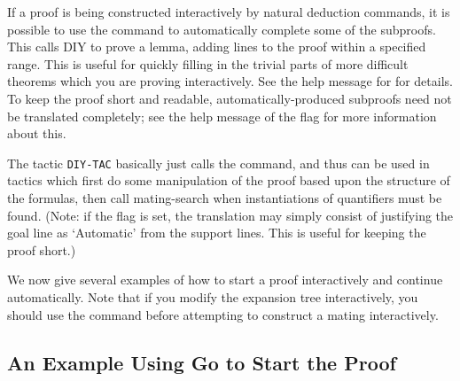 If a proof is being constructed interactively by natural deduction
commands, it is possible to use the command  to automatically
complete some of the subproofs. This calls DIY to prove a
lemma, adding lines to the proof within a specified range. This is useful
for quickly filling in the trivial parts of more difficult theorems which
you are proving interactively. See the help message for 
for details. To keep the proof short and readable, automatically-produced subproofs
need not be translated completely; see the help message of the flag 
for more information about this.

The tactic {\tt DIY-TAC} basically just
calls the   command, and thus can be used in tactics which first do
some manipulation of the proof based upon the structure of the
formulas, then call mating-search when instantiations of quantifiers
must be found. (Note: if the flag  is set,
the translation may simply consist of justifying the goal line as `Automatic'
from the support lines. This is useful for keeping the proof short.)

We now give several examples of how to start a proof interactively
and continue automatically. Note that if you modify the expansion tree
interactively, you should use the command  before
attempting to construct a mating interactively.

\subsection{An Example Using Go to Start the Proof }

